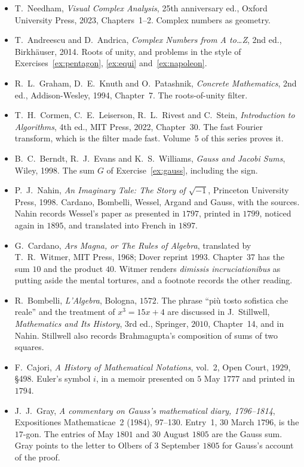 \begin{itemize}\raggedright
\item T.~Needham, \emph{Visual Complex Analysis}, 25th anniversary ed., Oxford University Press, 2023, Chapters~1--2. Complex numbers as geometry.
\item T.~Andreescu and D.~Andrica, \emph{Complex Numbers from A to\dots Z}, 2nd ed., Birkh\"auser, 2014. Roots of unity, and problems in the style of Exercises~\ref{ex:pentagon}, \ref{ex:equi} and~\ref{ex:napoleon}.
\item R.~L.~Graham, D.~E.~Knuth and O.~Patashnik, \emph{Concrete Mathematics}, 2nd ed., Addison-Wesley, 1994, Chapter~7. The roots-of-unity filter.
\item T.~H.~Cormen, C.~E.~Leiserson, R.~L.~Rivest and C.~Stein, \emph{Introduction to Algorithms}, 4th ed., MIT Press, 2022, Chapter~30. The fast Fourier transform, which is the filter made fast. Volume~5 of this series proves it.
\item B.~C.~Berndt, R.~J.~Evans and K.~S.~Williams, \emph{Gauss and Jacobi Sums}, Wiley, 1998. The sum $G$ of Exercise~\ref{ex:gauss}, including the sign.
\item P.~J.~Nahin, \emph{An Imaginary Tale: The Story of $\sqrt{-1}$}, Princeton University Press, 1998. Cardano, Bombelli, Wessel, Argand and Gauss, with the sources. Nahin records Wessel's paper as presented in $1797$, printed in $1799$, noticed again in $1895$, and translated into French in $1897$.
\item G.~Cardano, \emph{Ars Magna, or The Rules of Algebra}, translated by T.~R.~Witmer, MIT Press, 1968; Dover reprint $1993$. Chapter~37 has the sum $10$ and the product $40$. Witmer renders \emph{dimissis incruciationibus} as putting aside the mental tortures, and a footnote records the other reading.
\item R.~Bombelli, \emph{L'Algebra}, Bologna, $1572$. The phrase ``pi\`u tosto sofistica che reale'' and the treatment of $x^3=15x+4$ are discussed in J.~Stillwell, \emph{Mathematics and Its History}, 3rd ed., Springer, $2010$, Chapter~14, and in Nahin. Stillwell also records Brahmagupta's composition of sums of two squares.
\item F.~Cajori, \emph{A History of Mathematical Notations}, vol.~2, Open Court, $1929$, \S498. Euler's symbol $i$, in a memoir presented on $5$ May $1777$ and printed in $1794$.
\item J.~J.~Gray, \emph{A commentary on Gauss's mathematical diary, 1796--1814}, Expositiones Mathematicae~2 (1984), 97--130. Entry~1, $30$ March $1796$, is the $17$-gon. The entries of May $1801$ and $30$ August $1805$ are the Gauss sum. Gray points to the letter to Olbers of $3$ September $1805$ for Gauss's account of the proof.

\end{itemize}
